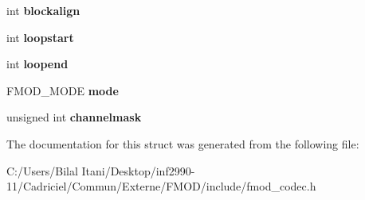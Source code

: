 \begin{DoxyCompactItemize}
\item 
int {\bfseries blockalign}\hypertarget{struct_f_m_o_d___c_o_d_e_c___w_a_v_e_f_o_r_m_a_t_a46df2a2789c6c438cd773762ed397a6f}{}\label{struct_f_m_o_d___c_o_d_e_c___w_a_v_e_f_o_r_m_a_t_a46df2a2789c6c438cd773762ed397a6f}

\item 
int {\bfseries loopstart}\hypertarget{struct_f_m_o_d___c_o_d_e_c___w_a_v_e_f_o_r_m_a_t_ae795e36327ba4772301f09501b2a8cc0}{}\label{struct_f_m_o_d___c_o_d_e_c___w_a_v_e_f_o_r_m_a_t_ae795e36327ba4772301f09501b2a8cc0}

\item 
int {\bfseries loopend}\hypertarget{struct_f_m_o_d___c_o_d_e_c___w_a_v_e_f_o_r_m_a_t_af6fe45ead433ef4bdb8d3e74859900f2}{}\label{struct_f_m_o_d___c_o_d_e_c___w_a_v_e_f_o_r_m_a_t_af6fe45ead433ef4bdb8d3e74859900f2}

\item 
F\+M\+O\+D\+\_\+\+M\+O\+DE {\bfseries mode}\hypertarget{struct_f_m_o_d___c_o_d_e_c___w_a_v_e_f_o_r_m_a_t_a1f23ba212c380e08e9d0b83f16a00320}{}\label{struct_f_m_o_d___c_o_d_e_c___w_a_v_e_f_o_r_m_a_t_a1f23ba212c380e08e9d0b83f16a00320}

\item 
unsigned int {\bfseries channelmask}\hypertarget{struct_f_m_o_d___c_o_d_e_c___w_a_v_e_f_o_r_m_a_t_aced974dac899dfe17cc5299453904281}{}\label{struct_f_m_o_d___c_o_d_e_c___w_a_v_e_f_o_r_m_a_t_aced974dac899dfe17cc5299453904281}

\end{DoxyCompactItemize}


The documentation for this struct was generated from the following file\+:\begin{DoxyCompactItemize}
\item 
C\+:/\+Users/\+Bilal Itani/\+Desktop/inf2990-\/11/\+Cadriciel/\+Commun/\+Externe/\+F\+M\+O\+D/include/fmod\+\_\+codec.\+h\end{DoxyCompactItemize}
